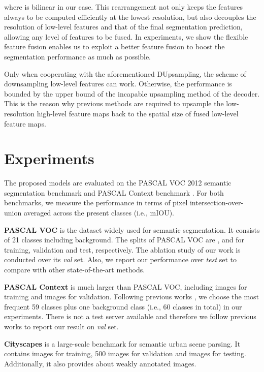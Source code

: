 \documentclass[10pt,twocolumn,letterpaper]{article}
\newcommand{\1}{{\mathbbm{1}}}
\begin{document}
where  is bilinear in our case. This rearrangement not only keeps the features always to be computed efficiently at the lowest resolution, but also decouples the resolution of low-level features  and that of the final segmentation prediction, allowing any level of features to be fused. In experiments, we show the flexible feature fusion enables us to exploit a better feature fusion to boost the segmentation performance as much as possible.

Only when cooperating with the aforementioned DUpsampling, the scheme of downsampling low-level features can work. Otherwise, the performance is bounded by the upper bound of the incapable upsampling method of the decoder.
This is the reason why previous methods are required to upsample the low-resolution high-level feature maps back to the spatial size of fused low-level feature maps.



\section{Experiments}

The proposed models are evaluated on the PASCAL VOC 2012 semantic segmentation benchmark \cite{everingham2010pascal} and PASCAL Context benchmark \cite{mottaghi2014role}. For both benchmarks, we measure the performance in terms of pixel intersection-over-union averaged across the present classes (i.e., mIOU).

\textbf{PASCAL VOC} is the  dataset widely used for semantic segmentation. It consists of 21 classes including background. The splits of PASCAL VOC are ,  and  for training, validation and test, respectively. The ablation study of our work is conducted over its {\it val} set. Also, we report our performance over {\it test} set to compare with other state-of-the-art methods.

\textbf{PASCAL Context} is much larger than PASCAL VOC,
including  images for training and  images for validation. Following previous works \cite{lin2017refinenet, mottaghi2014role}, we choose the most frequent 59 classes plus one background class (i.e., 60 classes in total) in our experiments. There is not a test server available and therefore we follow previous works \cite{lin2017refinenet, zhang2018context, chen2018deeplab, long2015fully, zheng2015conditional} to report our result on {\it val} set.

\textbf{Cityscapes} is a large-scale benchmark for semantic urban scene parsing. It contains  images for training, 500 images for validation and  images for testing. Additionally, it also provides about  weakly annotated images.
\end{document}
